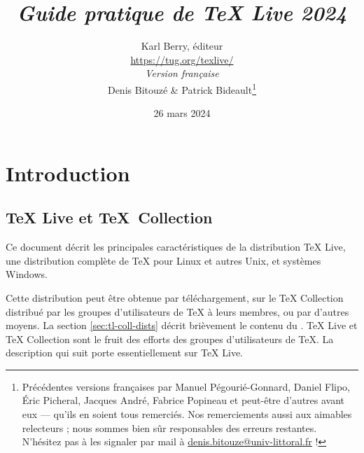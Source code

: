 \documentclass[german, english, french, 12pt]{article}
\renewcommand{\TL}{\TeX{} Live\xspace}%
\renewcommand{\TK}{\TeX{} Collection\xspace}%
\newcommand*\semail[1]{\href{mailto:#1}{#1}}
\begin{document}
\title{%
  \huge \emph{Guide pratique de \TL 2024}%
}

\author{
  Karl Berry, éditeur \\[3mm]
  \url{https://tug.org/texlive/} \\[6mm]
  \textit{Version française} \\[3mm]
  Denis Bitouzé \& Patrick Bideault\thanks{%
    Précédentes versions françaises par Manuel Pégourié-Gonnard, Daniel Flipo,
    Éric Picheral, Jacques André, Fabrice Popineau et peut-être d'autres avant
    eux --- qu'ils en soient tous remerciés. Nos remerciements aussi aux
    aimables relecteurs ; nous sommes bien sûr responsables des erreurs
    restantes. N'hésitez pas à les signaler par mail
    à \semail{denis.bitouze@univ-littoral.fr} !%
  }%
}


\date{26 mars 2024}

\maketitle

\begin{multicols}{2}
  \tableofcontents
\end{multicols}

\section{Introduction}
\label{sec:intro}

\subsection{\protect\TL{} et \protect\TeX\ Collection}

Ce document décrit les principales caractéristiques de la distribution \TL{},
une distribution complète de \TeX{} pour Linux et autres Unix, \macOS{} et
systèmes Windows.

Cette distribution peut être obtenue par téléchargement, sur le \DVD{} \TK{}
distribué par les groupes d'utilisateurs de \TeX{} à leurs membres, ou par
d'autres moyens.  La section \ref{sec:tl-coll-dists} décrit brièvement le
contenu du \DVD.  \TL{} et \TK{} sont le fruit des efforts des groupes
d'utilisateurs de \TeX. La description qui suit porte essentiellement sur \TL{}.
\end{document}
